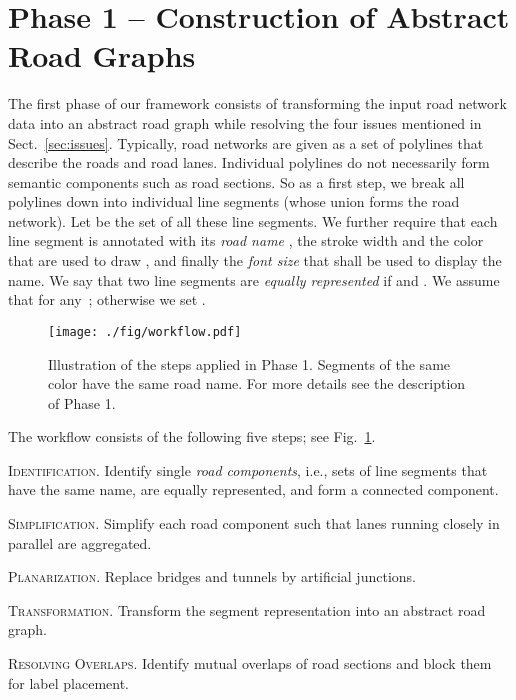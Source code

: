 \documentclass[a4paper,11pt]{article}
\begin{document}
\section{Phase 1 -- Construction of Abstract Road Graphs}\label{sec:transformation}

The first phase of our framework consists of transforming the input road network data into an abstract road graph while resolving the four issues mentioned in Sect.~\ref{sec:issues}.
Typically, road networks are
given as a set of polylines that describe the 
roads and road lanes. Individual polylines do not necessarily form semantic components such as road sections.
So as a first step, we break all polylines down into individual line segments (whose union forms the road network).
Let  be the set of all these line segments.
We further require that each line segment 
is annotated with its \emph{road name} , the stroke width
 and the color  that are used to draw ,
and finally the \emph{font size}  that shall be used to
display the name. We say that two line
segments  are \emph{equally represented} if
 and . We assume
that  for any~; otherwise we set
.

\begin{figure}[t]
\centering
\texttt{[image: ./fig/workflow.pdf]}
\caption{Illustration of the steps applied in Phase 1. Segments of the same color have the same road name. For more details see the description of Phase 1. }
\label{fig:workflow}
\end{figure}

The workflow consists of the following five
steps; see Fig.~\ref{fig:workflow}.
\begin{inparaenum}[(1)]
\item \textsc{Identification.} Identify single \emph{road
    components}, i.e., sets of line segments that have the same name,
  are equally represented, and form a connected component.
\item \textsc{Simplification.} Simplify each road component such that lanes  running closely in parallel are aggregated. 
\item \textsc{Planarization.} Replace bridges and tunnels by artificial junctions. 
\item \textsc{Transformation.} Transform the segment representation into an abstract road graph. \item \textsc{Resolving Overlaps.} Identify mutual overlaps of road sections  and block them for label placement.
\end{inparaenum}
\end{document}
